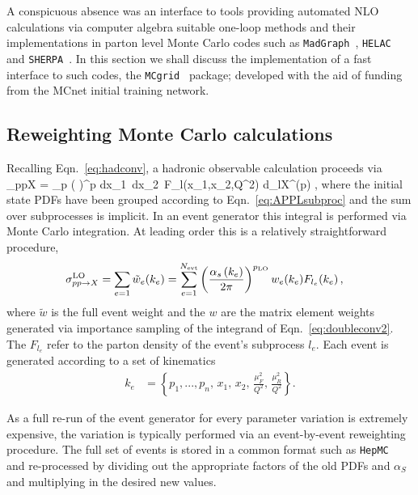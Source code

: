 A conspicuous absence was an interface to tools providing automated NLO calculations via computer algebra suitable one-loop methods\cite{Anastasiou:2006jv,Berger:2008sj,Denner:2005nn,Ellis:2007br,Giele:2008ve,Ossola:2006us} and their implementations in parton level Monte Carlo codes such as {\tt MadGraph}~\cite{Alwall:2011uj}, {\tt HELAC}~\cite{Bevilacqua:2011xh} and {\tt SHERPA}~\cite{Gleisberg:2003xi,Gleisberg:2008ta}. In this section we shall discuss the implementation of a fast interface to such codes, the {\tt MCgrid}~\cite{DelDebbio:2013kxa} package; developed with the aid of funding from the MCnet initial training network.  


\subsection{Reweighting Monte Carlo calculations}
Recalling Eqn.~\ref{eq:hadconv}, a hadronic observable calculation proceeds via
\be  \sigma_{pp\to X} = \sum_p \left(  \right)^{p} \int dx_1\, dx_2\,  F_l(x_1,x_2,Q^2)\; d\hat{\sigma}_{l\to X}^{(p)}\; , \label{eq:doubleconv2} \ee
where the initial state PDFs have been grouped according to Eqn.~\ref{eq:APPLsubproc} and the sum over subprocesses is implicit. In an event generator this integral is performed via Monte Carlo integration. At leading order this is a relatively straightforward procedure,
\begin{align}
  \label{eq:basicMC}
  \sigma_{pp\to X}^{\text{LO}} &= \sum_{e=1} \tilde{w}_e(k_e) = \sum_{e=1}^{N_{\mathrm{evt}}} \left(  {{\alpha_s\left(k_e\right)}\over {2\pi}} \right)^{p_{\text{LO}}} w_e(k_e) F_{l_e}(k_e)\, ,
\end{align}
where $\tilde{w}$ is the full event weight and the $w$ are the matrix element weights generated via importance sampling of the integrand of Eqn.~\ref{eq:doubleconv2}. The $F_{l_e}$ refer to the parton density of the event's subprocess $l_e$. Each event is generated according to a set of kinematics
\begin{align}
  k_e &= \left\{p_1, ..., p_n,\,x_1,\,x_2,\,\frac{\mu_F^2}{Q^2},\,\frac{\mu_R^2}{Q^2} \right\}.
\end{align}

As a full re-run of the event generator for every parameter variation is extremely expensive, the variation is typically performed via an event-by-event reweighting procedure. The full set of events is stored
in a common format such as { \tt HepMC}~\cite{Dobbs:2001ck} and re-processed by dividing out the appropriate factors of the old PDFs and $\alpha_S$ and multiplying in the desired new values. 

